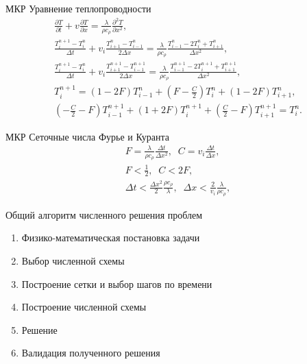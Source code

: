 \documentclass[12pt]{beamer}
\begin{document}
\begin{frame}{МКР Уравнение теплопроводности}
    \begin{eqnarray}
        \frac{\partial T}{\partial t} + v \frac{\partial T}{\partial x}  =  \frac{\lambda}{\rho c_{\rho}} \frac{\partial^2 T}{\partial x^2},\\
        \frac{T_i^{n+1} - T_i^{n}}{\Delta t} + v_{i}\frac{T_{i+1}^{n}-T_{i-1}^{n}}{2\Delta x} =  \frac{\lambda}{\rho c_{\rho}}\frac{T_{i-1}^{n} - 2T_i^{n} + T_{i+1}^{n}}{\Delta x^2},\\
        \frac{T_i^{n+1} - T_i^{n}}{\Delta t} + v_{i}\frac{T_{i+1}^{n+1}-T_{i-1}^{n+1}}{2\Delta x} =  \frac{\lambda}{\rho c_{\rho}}\frac{T_{i-1}^{n+1} - 2T_i^{n+1} + T_{i+1}^{n+1}}{\Delta x^2},\\       
        T_i^{n+1} = \left(1 - 2F \right) T_{i-1}^{n} + \left(F - \frac{C}{2} \right) T_i^{n} + \left(1 - 2F \right) T_{i+1}^{n},\\
        \left(-\frac{C}{2} - F \right) T_{i-1}^{n+1} + \left(1 + 2F \right) T_i^{n+1} + \left(\frac{C}{2} - F \right) T_{i+1}^{n+1} = T_i^{n}.
    \end{eqnarray}
\end{frame}

\begin{frame}{МКР Сеточные числа Фурье и Куранта}
    \begin{eqnarray}
        F = \frac{\lambda}{\rho c_{\rho}} \frac{\Delta t}{\Delta x^2}, \; \; C = v_{i} \frac{\Delta t}{\Delta x},\\
        F < \frac{1}{2}, \; \; C < 2F,\\
        \Delta t < \frac{\Delta x^2}{2} \frac{\rho c_{\rho}}{\lambda}, \; \; \Delta x < \frac{2}{v_{i}} \frac{\lambda}{\rho c_{\rho}},
    \end{eqnarray}
\end{frame}

\begin{frame}{Общий алгоритм численного решения проблем}
    \begin{enumerate}
        \item Физико-математическая постановка задачи
        \vspace{0.2 cm} 
        \item Выбор численной схемы
        \vspace{0.2 cm}
        \item Построение сетки и выбор шагов по времени
        \vspace{0.2 cm}
        \item Построение численной схемы
        \vspace{0.2 cm}
        \item  Решение
        \vspace{0.2 cm}
        \item Валидация полученного решения
    \end{enumerate}
\end{frame}
\end{document}
